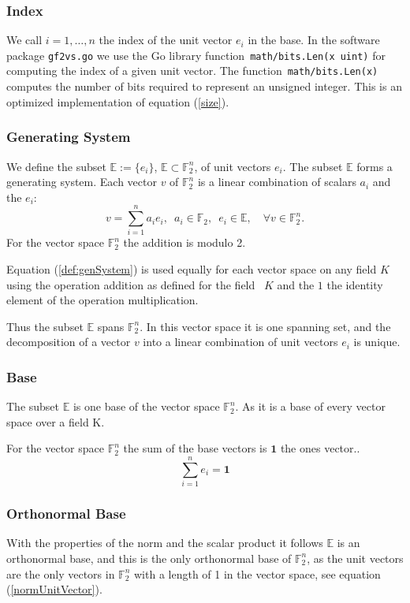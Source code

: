 \documentclass[a4paper]{article}
\newcommand{\BE}{\mathbb{E}}
\newcommand{\BF}{\mathbb{F}}
\newcommand{\0}{\mathbf{0}}
\newcommand{\1}{\mathbf{1}}
\begin{document}
\subsubsection{Index}
We call $i = 1, \dots, n$ the index of the unit vector $e_i$ in the base.
In the software package \texttt{gf2vs.go} we use the Go library function~\texttt{math/bits.Len(x uint)} for computing the
index of a given unit vector. The function~\texttt{math/bits.Len(x)} computes the number of bits required to represent
an unsigned integer. This is an optimized implementation of equation (\ref{size}).

\subsubsection{Generating System}
We define the subset $\BE := \{e_i\}$, $\BE \subset \BF_2^n$, of unit vectors $e_i$.
The subset $\BE$ forms a generating system. Each vector $v$ of $\BF_2^n$ is a linear combination of scalars $a_i$ and the $e_i$:
\begin{equation}
v = \sum_{i=1}^n a_i e_i, \enspace a_i \in \BF_2, \enspace e_i \in \BE, \quad \forall v \in \BF_2^n.
\label{def:genSystem}
\end{equation}
For the vector space $\BF_2^n$ the addition is modulo 2.

Equation (\ref{def:genSystem}) is used equally for each vector space on any field $K$ using
the operation addition as defined for the field~ $K$ and the $1$ the identity element of the operation multiplication.

Thus the subset $\BE$ spans $\BF_2^n$. In this vector space it is one spanning set,
and the decomposition of a vector $v$ into a linear combination
of unit vectors $e_i$ is unique.

\subsubsection{Base}
The subset $\BE$ is one base of the vector space $\BF_2^n$. As it is a base of every vector space over a field K.

For the vector space $\BF_2^n$ the sum of the base vectors is $\1$ the ones vector..
\begin{equation}
	\sum_{i=1}^n e_i = \1
\end{equation}

\subsubsection{Orthonormal Base}
With the properties of the norm and the scalar product it follows $\BE$ is an orthonormal base, and this is the only orthonormal base of $\BF_2^n$, as the unit vectors are the only vectors in $\BF_2^n$ with a length of 1 in the vector space, see equation (\ref{normUnitVector}).
\end{document}
